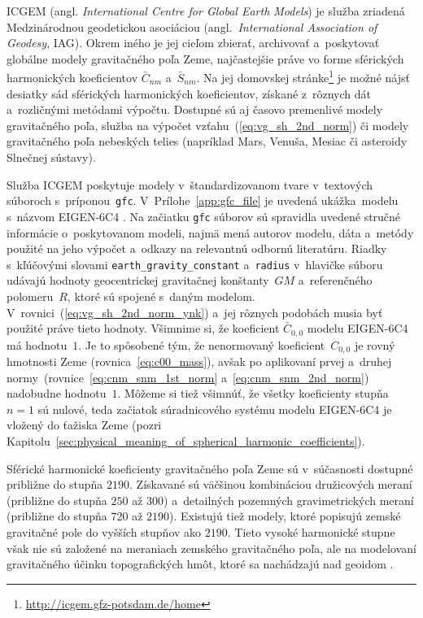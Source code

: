 \documentclass[a4paper, 12pt]{book}
\begin{document}
ICGEM (angl. \emph{International Centre for Global Earth Models}) je služba 
zriadená Medzinárodnou geodetickou asociáciou (angl.~\emph{International 
Association of Geodesy}, IAG).  Okrem iného je jej cieľom zbierať, archivovať 
a~poskytovať globálne modely gravitačného poľa Zeme, najčastejšie práve vo 
forme sférických harmonických koeficientov $\bar{C}_{nm}$ a~$\bar{S}_{nm}$.  Na 
jej domovskej stránke\footnote{\url{http://icgem.gfz-potsdam.de/home}} je možné 
nájsť desiatky sád sférických harmonických koeficientov, získané z~rôznych dát 
a~rozličnými metódami výpočtu.  Dostupné sú aj časovo premenlivé modely 
gravitačného poľa, služba na výpočet vzťahu~(\ref{eq:vg_sh_2nd_norm}) či modely 
gravitačného poľa nebeských telies (napríklad Mars, Venuša, Mesiac či asteroidy 
Slnečnej sústavy).

Služba ICGEM poskytuje modely v~štandardizovanom tvare v~textových súboroch 
s~príponou~\texttt{gfc}.  V~Prílohe~\ref{app:gfc_file} je uvedená ukážka~modelu 
s~názvom EIGEN-6C4 \parencite{EIGEN-6C4}.  Na začiatku \texttt{gfc} súborov sú 
spravidla uvedené stručné informácie o~poskytovanom modeli, najmä mená autorov 
modelu, dáta a~metódy použité na jeho výpočet a~odkazy na relevantnú odbornú 
literatúru.  Riadky s~kľúčovými slovami \texttt{earth\_gravity\_constant} 
a~\texttt{radius} v~hlavičke súboru udávajú hodnoty geocentrickej gravitačnej 
konštanty~$GM$ a~referenčného polomeru~$R$, ktoré sú spojené s~daným modelom.  
V~rovnici~(\ref{eq:vg_sh_2nd_norm_ynk}) a~jej rôznych podobách musia byť 
použité práve tieto hodnoty.  Všimnime si, že koeficient $\bar{C}_{0,0}$ modelu 
EIGEN-6C4 má hodnotu~$1$.  Je to spôsobené tým, že nenormovaný 
koeficient~$C_{0,0}$ je rovný hmotnosti Zeme (rovnica~\ref{eq:c00_mass}), avšak 
po aplikovaní prvej a~druhej normy~(rovnice~\ref{eq:cnm_snm_1st_norm} 
a~\ref{eq:cnm_snm_2nd_norm}) nadobudne hodnotu~$1$.  Môžeme si tiež všimnúť, že 
všetky koeficienty stupňa~$n = 1$ sú nulové, teda začiatok súradnicového 
systému modelu EIGEN-6C4 je vložený do ťažiska Zeme (pozri 
Kapitolu~\ref{sec:physical_meaning_of_spherical_harmonic_coefficients}).

Sférické harmonické koeficienty gravitačného poľa Zeme sú v~súčasnosti dostupné
približne do stupňa $2190$.  Získavané sú väčšinou kombináciou družicových
meraní (približne do stupňa $250$ až $300$) a~detailných pozemných
gravimetrických meraní (približne do stupňa $720$ až $2190$).  Existujú tiež 
modely, ktoré popisujú zemské gravitačné pole do vyšších stupňov ako $2190$.  
Tieto vysoké harmonické stupne však nie sú založené na meraniach zemského 
gravitačného poľa, ale na modelovaní gravitačného účinku topografických hmôt, 
ktoré sa nachádzajú nad geoidom \parencite[napríklad][]{Ince2020}.
\end{document}
